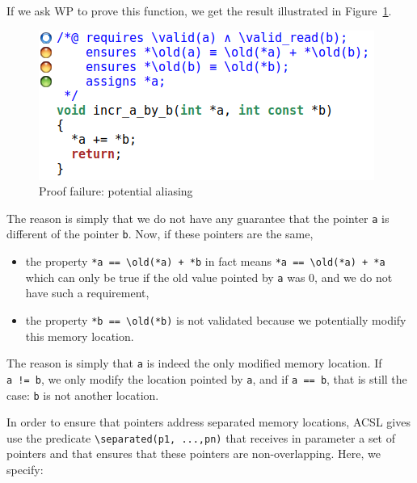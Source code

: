 \documentclass[12pt,francais,]{scrbook}
\providecommand{\tightlist}{%
  \setlength{\itemsep}{0pt}\setlength{\parskip}{0pt}}
\newenvironment{zdsexampleblock}[1]{%
  \tcolorbox[beamer,%
    noparskip,breakable,
    colback=LightGreen,colframe=DarkGreen,%
    colbacklower=LimeGreen,%
    title=#1]
}{\endtcolorbox}
\begin{document}
If we ask WP to prove this function, we get the result illustrated in
Figure~\ref{fig:2-2-2-incr_a_by_b-1}.

\begin{figure}[htbp]
\centering
\includegraphics[scale=0.5]{2-2-2-incr_a_by_b-1.png}
\caption{Proof failure: potential aliasing}
\label{fig:2-2-2-incr_a_by_b-1}
\end{figure}

The reason is simply that we do not have any guarantee that the pointer
\texttt{a} is different of the pointer \texttt{b}. Now, if these
pointers are the same,

\begin{itemize}
\tightlist
\item
  the property \texttt{*a\ ==\ \textbackslash{}old(*a)\ +\ *b} in fact
  means \texttt{*a\ ==\ \textbackslash{}old(*a)\ +\ *a} which can only
  be true if the old value pointed by \texttt{a} was \(0\), and we do
  not have such a requirement,
\item
  the property \texttt{*b\ ==\ \textbackslash{}old(*b)} is not validated
  because we potentially modify this memory location.
\end{itemize}

\begin{zdsexampleblock}{Why is the \texttt{assign} clause validated ?}
  The reason is simply that \texttt{a} is indeed the only modified memory
  location. If \texttt{a\ !=\ b}, we only modify the location pointed by
  \texttt{a}, and if \texttt{a\ ==\ b}, \textbar{} that is still the case:
  \texttt{b} is not another location.
\end{zdsexampleblock}

In order to ensure that pointers address separated memory locations,
ACSL gives use the predicate
\texttt{\textbackslash{}separated(p1,\ ...,pn)} that receives in
parameter a set of pointers and that ensures that these pointers are
non-overlapping. Here, we specify:
\end{document}

